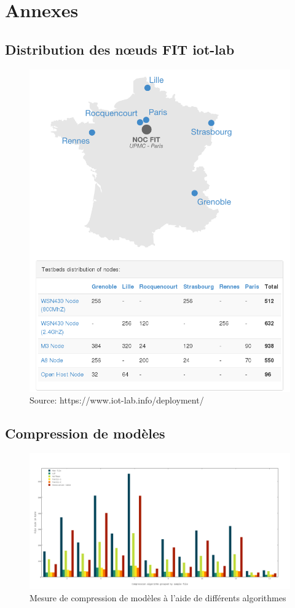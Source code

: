 \section*{Annexes} %
\appendix
\renewcommand\thefigure{\thesection.\arabic{figure}}
\setcounter{figure}{0}
\setcounter{section}{1}


\subsection{\label{iot-lab}Distribution des nœuds FIT iot-lab}


\begin{figure}[ht!]
\centering
\includegraphics[scale=0.6]{images/iot-lab.png}
\caption{Source: https://www.iot-lab.info/deployment/}
\end{figure}

\begin{landscape}
\subsection{\label{comp-tabde}Compression de modèles}
\begin{figure}[ht!]
\centering
\includegraphics[scale=0.45]{images/compression.png}
\caption{Mesure de compression de modèles à l'aide de différents algorithmes}
\end{figure}
\end{landscape}
